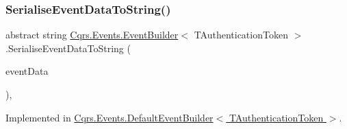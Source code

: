 \subsubsection{\texorpdfstring{Serialise\+Event\+Data\+To\+String()}{SerialiseEventDataToString()}}
{\footnotesize\ttfamily abstract string \hyperlink{classCqrs_1_1Events_1_1EventBuilder}{Cqrs.\+Events.\+Event\+Builder}$<$ T\+Authentication\+Token $>$.Serialise\+Event\+Data\+To\+String (\begin{DoxyParamCaption}\item[{\hyperlink{interfaceCqrs_1_1Events_1_1IEvent}{I\+Event}$<$ T\+Authentication\+Token $>$}]{event\+Data }\end{DoxyParamCaption})\hspace{0.3cm}{\ttfamily [protected]}, {}}



Implemented in \hyperlink{classCqrs_1_1Events_1_1DefaultEventBuilder_afb73a13003a94135e5c97436e7e78e13}{Cqrs.\+Events.\+Default\+Event\+Builder$<$ T\+Authentication\+Token $>$}.

